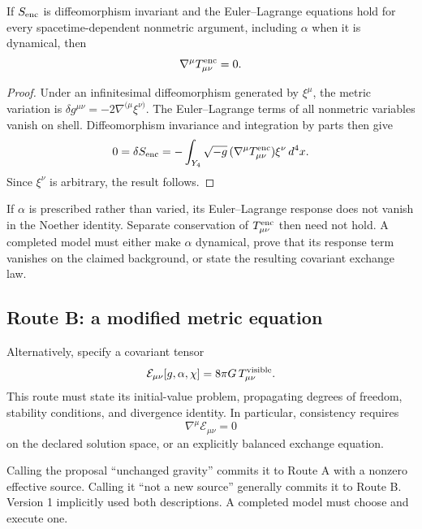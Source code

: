 \documentclass[11pt]{article}
\begin{document}
\begin{theorem}
\label{thm:conservation}
If $S_{\rm enc}$ is diffeomorphism invariant and the Euler--Lagrange equations
hold for every spacetime-dependent nonmetric argument, including $\alpha$ when
it is dynamical, then
\[
\nabla^\mu T_{\mu\nu}^{\rm enc}=0.
\]
\end{theorem}

\begin{proof}
Under an infinitesimal diffeomorphism generated by $\xi^\mu$, the metric
variation is
$\delta g^{\mu\nu}=-2\nabla^{(\mu}\xi^{\nu)}$.
The Euler--Lagrange terms of all nonmetric variables vanish on shell.
Diffeomorphism invariance and integration by parts then give
\[
0=\delta S_{\rm enc}
=-\int_{Y_4}\sqrt{-g}\,
(\nabla^\mu T_{\mu\nu}^{\rm enc})\xi^\nu\,d^4x.
\]
Since $\xi^\nu$ is arbitrary, the result follows.
\end{proof}

\begin{remark}
If $\alpha$ is prescribed rather than varied, its Euler--Lagrange response
does not vanish in the Noether identity.  Separate conservation of
$T_{\mu\nu}^{\rm enc}$ then need not hold.  A completed model must either make
$\alpha$ dynamical, prove that its response term vanishes on the claimed
background, or state the resulting covariant exchange law.
\end{remark}

\subsection{Route B: a modified metric equation}

Alternatively, specify a covariant tensor
\[
\mathcal E_{\mu\nu}[g,\alpha,\chi]
=8\pi G\,T_{\mu\nu}^{\rm visible}.
\]
This route must state its initial-value problem, propagating degrees of freedom,
stability conditions, and divergence identity.  In particular, consistency
requires
\[
\nabla^\mu \mathcal E_{\mu\nu}=0
\]
on the declared solution space, or an explicitly balanced exchange equation.

\begin{remark}
Calling the proposal ``unchanged gravity'' commits it to Route A with a
nonzero effective source.  Calling it ``not a new source'' generally commits
it to Route B.  Version 1 implicitly used both descriptions.  A completed
model must choose and execute one.
\end{remark}
\end{document}

